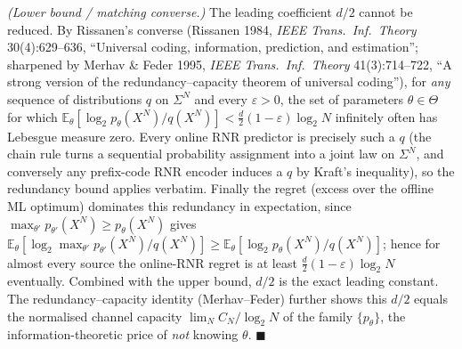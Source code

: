 \documentclass[
]{article}
\begin{document}
\emph{(Lower bound / matching converse.)} The leading coefficient
$d/2$ cannot be reduced. By Rissanen's converse (Rissanen 1984,
\emph{IEEE Trans.\ Inf.\ Theory} 30(4):629--636, ``Universal coding,
information, prediction, and estimation''; sharpened by Merhav \&
Feder 1995, \emph{IEEE Trans.\ Inf.\ Theory} 41(3):714--722, ``A
strong version of the redundancy--capacity theorem of universal
coding''), for \emph{any} sequence of distributions $q$ on $\Sigma^N$
and every $\varepsilon>0$, the set of parameters
$\theta\in\Theta$ for which
$\mathbb{E}_\theta[\log_2 p_\theta(X^N)/q(X^N)] <
\tfrac{d}{2}(1-\varepsilon)\log_2 N$ infinitely often has Lebesgue
measure zero. Every online RNR predictor is precisely such a $q$
(the chain rule turns a sequential probability assignment into a
joint law on $\Sigma^N$, and conversely any prefix-code RNR encoder
induces a $q$ by Kraft's inequality), so the redundancy bound applies
verbatim. Finally the regret (excess over the offline ML optimum)
dominates this redundancy in expectation, since
$\max_{\theta'} p_{\theta'}(X^N) \geq p_\theta(X^N)$ gives
$\mathbb{E}_\theta[\log_2 \max_{\theta'} p_{\theta'}(X^N)/q(X^N)]
\geq \mathbb{E}_\theta[\log_2 p_\theta(X^N)/q(X^N)]$; hence
for almost every source the online-RNR regret is at least
$\tfrac{d}{2}(1-\varepsilon)\log_2 N$ eventually. Combined with the
upper bound, $d/2$ is the exact leading constant. The
redundancy--capacity identity (Merhav--Feder) further shows this
$d/2$ equals the normalised channel capacity
$\lim_N C_N/\log_2 N$ of the family $\{p_\theta\}$, the
information-theoretic price of \emph{not} knowing $\theta$.
\hfill$\blacksquare$
\end{document}
